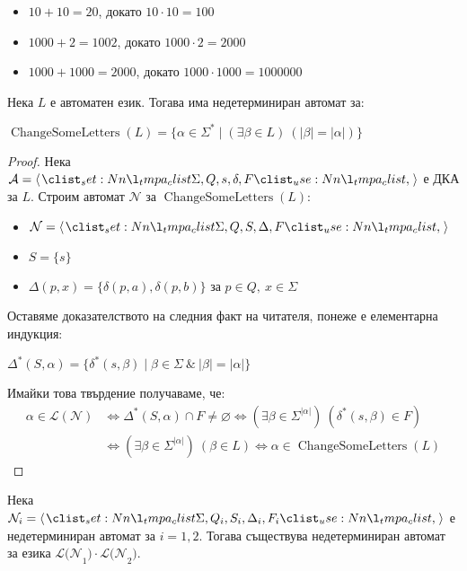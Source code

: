 \begin{itemize}
    \item $10 + 10 = 20$, докато $10 \cdot 10 = 100$
    \item $1000 + 2 = 1002$, докато $1000 \cdot 2 = 2000$
    \item $1000 + 1000 = 2000$, докато $1000 \cdot 1000 = 1000000$
\end{itemize}

\begin{claim}
    Нека $L$ е автоматен език.
    Тогава има недетерминиран автомат за:
    \begin{center}
        $\operatorname{ChangeSomeLetters}(L) = \{ \alpha \in \Sigma^* \mid (\exists \beta \in L) \: (|\beta| = |\alpha| ) \}$
    \end{center}
\end{claim}

\begin{proof}
    Нека $\mathcal{A} = \opair{\Sigma, Q, s, \delta, F}$ е ДКА за $L$.
    Строим автомат $\mathcal{N}$ за $\operatorname{ChangeSomeLetters}(L)$:
    \begin{itemize}
        \item $\mathcal{N} = \opair{\Sigma, Q, S, \Delta, F}$
        \item $S = \{ s \}$
        \item $\Delta(p, x) = \{ \delta(p, a), \delta(p, b) \}$ за $p \in Q, \: x \in \Sigma$
    \end{itemize}

    Оставяме доказателството на следния факт на читателя, понеже е елементарна индукция:
    \begin{center}
        $\Delta^*(S, \alpha) = \{ \delta^*(s, \beta) \mid \beta \in \Sigma \: \& \: |\beta| = |\alpha| \}$
    \end{center}

    Имайки това твърдение получаваме, че:
    \begin{align*}
        \alpha \in \mathcal{L(N)} & \iff \Delta^*(S, \alpha) \cap F \neq \varnothing \iff (\exists \beta \in \Sigma^{|\alpha|}) \: (\delta^*(s, \beta) \in F) \\
                                  & \iff (\exists \beta \in \Sigma^{|\alpha|}) \: (\beta \in L) \iff \alpha \in \operatorname{ChangeSomeLetters}(L)
    \end{align*}
\end{proof}

\begin{claim}
    Нека $\mathcal{N}_i = \opair{\Sigma, Q_i, S_i, \Delta_i, F_i}$  е недетерминиран автомат за $i = 1, 2$.
    Тогава съществува недетерминиран автомат за езика $\mathcal{L(N}_1) \cdot \mathcal{L(N}_2)$.
\end{claim}


